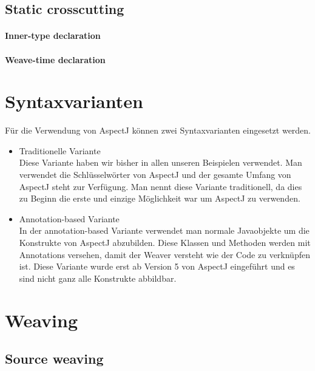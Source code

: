 

\subsection{Static crosscutting}

\paragraph{Inner-type declaration}

\paragraph{Weave-time declaration}

\section{Syntaxvarianten}
Für die Verwendung von AspectJ können zwei Syntaxvarianten eingesetzt werden.

\begin{itemize}
\item Traditionelle Variante \\
Diese Variante haben wir bisher in allen unseren Beispielen verwendet. Man verwendet die Schlüsselwörter von AspectJ und der gesamte Umfang von AspectJ steht zur Verfügung. Man nennt diese Variante traditionell, da dies zu Beginn die erste und einzige Möglichkeit war um AspectJ zu verwenden.
\item Annotation-based Variante \\
In der annotation-based Variante verwendet man normale Javaobjekte um die Konstrukte von AspectJ abzubilden. Diese Klassen und Methoden werden mit Annotations versehen, damit der Weaver versteht wie der Code zu verknüpfen ist. Diese Variante wurde erst ab Version 5 von AspectJ eingeführt und es sind nicht ganz alle Konstrukte abbildbar.
\end{itemize}



\section{Weaving}

\subsection{Source weaving}


